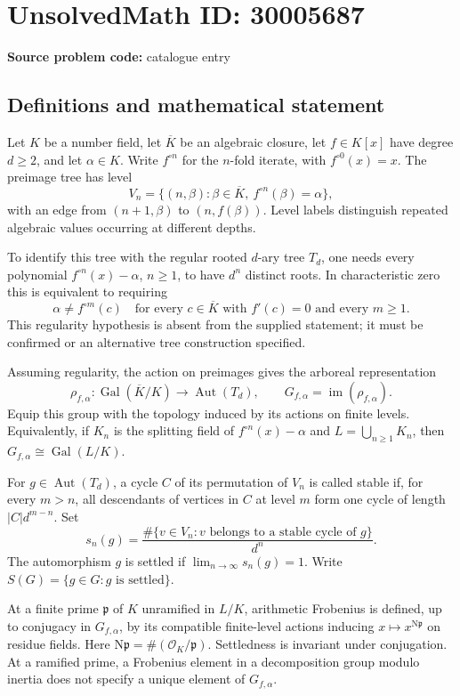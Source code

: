 \documentclass[11pt]{article}
\begin{document}
\section*{UnsolvedMath ID: 30005687}
\textbf{Source problem code:} catalogue entry
\subsection{Definitions and mathematical statement}
Let \(K\) be a number field, let \(\overline K\) be an algebraic closure, let \(f\in K[x]\) have degree \(d\geq 2\), and let \(\alpha\in K\). Write \(f^{\circ n}\) for the \(n\)-fold iterate, with \(f^{\circ 0}(x)=x\). The preimage tree has level
\[
V_n=\{(n,\beta):\beta\in\overline K,\ f^{\circ n}(\beta)=\alpha\},
\]
with an edge from \((n+1,\beta)\) to \((n,f(\beta))\). Level labels distinguish repeated algebraic values occurring at different depths.

To identify this tree with the regular rooted \(d\)-ary tree \(T_d\), one needs every polynomial \(f^{\circ n}(x)-\alpha\), \(n\geq1\), to have \(d^n\) distinct roots. In characteristic zero this is equivalent to requiring
\[
\alpha\neq f^{\circ m}(c)
\quad\text{for every }c\in\overline K\text{ with }f'(c)=0
\text{ and every }m\geq1.
\]
This regularity hypothesis is absent from the supplied statement; it must be confirmed or an alternative tree construction specified.

Assuming regularity, the action on preimages gives the arboreal representation
\[
\rho_{f,\alpha}:\operatorname{Gal}(\overline K/K)\longrightarrow\operatorname{Aut}(T_d),
\qquad
G_{f,\alpha}=\operatorname{im}(\rho_{f,\alpha}).
\]
Equip this group with the topology induced by its actions on finite levels. Equivalently, if \(K_n\) is the splitting field of \(f^{\circ n}(x)-\alpha\) and \(L=\bigcup_{n\geq1}K_n\), then \(G_{f,\alpha}\cong\operatorname{Gal}(L/K)\).

For \(g\in\operatorname{Aut}(T_d)\), a cycle \(C\) of its permutation of \(V_n\) is called stable if, for every \(m>n\), all descendants of vertices in \(C\) at level \(m\) form one cycle of length \(|C|d^{m-n}\). Set
\[
s_n(g)=\frac{\#\{v\in V_n:v\text{ belongs to a stable cycle of }g\}}{d^n}.
\]
The automorphism \(g\) is settled if \(\lim_{n\to\infty}s_n(g)=1\). Write \(S(G)=\{g\in G:g\text{ is settled}\}\).

At a finite prime \(\mathfrak p\) of \(K\) unramified in \(L/K\), arithmetic Frobenius is defined, up to conjugacy in \(G_{f,\alpha}\), by its compatible finite-level actions inducing \(x\mapsto x^{\mathrm N\mathfrak p}\) on residue fields. Here \(\mathrm N\mathfrak p=\#(\mathcal O_K/\mathfrak p)\). Settledness is invariant under conjugation. At a ramified prime, a Frobenius element in a decomposition group modulo inertia does not specify a unique element of \(G_{f,\alpha}\).
\end{document}
